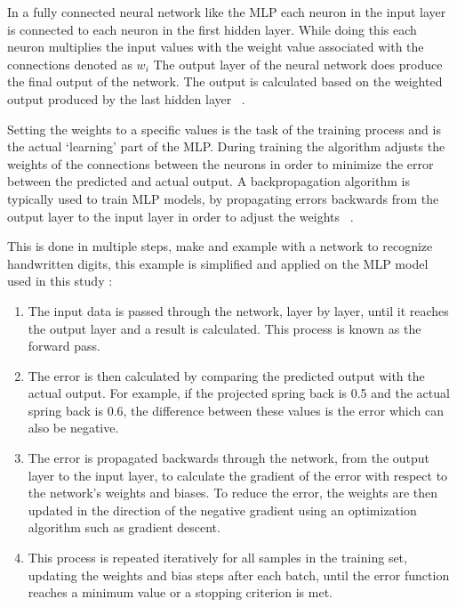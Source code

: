 In a fully connected neural network like the MLP each neuron in the input layer is connected to each neuron in the
first hidden layer.
While doing this each neuron multiplies the input values with the weight value associated with the connections
denoted as $w_i$
The output layer of the neural network does produce the final output of the network.
The output is calculated based on the weighted output produced by the last hidden layer
~\cite[p. 106]{muller2016introduction}.

Setting the weights to a specific values is the task of the training process and is the actual `learning' part of the
MLP.
During training the algorithm adjusts the weights of the connections between the neurons in order to minimize
the error between the predicted and actual output.
A backpropagation algorithm is typically used to train \ac{MLP} models, by
propagating errors backwards from the output layer to the input layer in order to adjust
the weights
~\cite[p. 454]{taud2018multilayer}.

This is done in multiple steps, \cite{nielsen2015neural} make and example with a network to recognize
handwritten digits, this example is simplified and applied on the MLP model used in this study
\cite[p. 12--24]{nielsen2015neural}:

\begin{enumerate}
    \item The input data is passed through the network, layer by layer, until it reaches the output layer and a
    result is calculated.
    This process is known as the forward pass.
    \item The error is then calculated by comparing the predicted output with the actual output.
    For example, if the projected spring back is 0.5 and the actual spring back is 0.6, the difference between these
    values is the error which can also be negative.
    \item The error is propagated backwards through the network, from the output layer to the input layer, to
    calculate the gradient of the error with respect to the network's weights and biases. To reduce the error,
    the weights are then updated in the direction of the negative gradient using an optimization algorithm such
    as gradient descent.
    \item This process is repeated iteratively for all
    samples in the training set, updating the weights and bias steps after each batch, until the error function
    reaches a minimum value or a stopping criterion is met.
\end{enumerate}


